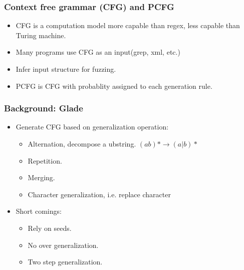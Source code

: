 \begin{frame}
	\frametitle{Context free grammar (CFG) and PCFG}
	\begin{itemize}
		\item CFG is a computation model more capable than regex, less capable than Turing machine.
		\item Many programs use CFG as an input(grep, xml, etc.)
		\item Infer input structure for fuzzing.
		\item PCFG is CFG with probablity assigned to each generation rule.
	\end{itemize}
\end{frame}
\begin{frame}
	\frametitle{Background: Glade}
	\begin{itemize}
		\item Generate CFG based on generalization operation:
		      \begin{itemize}
			      \item Alternation, decompose a ubstring. $(ab)* \rightarrow (a|b)*$
			      \item Repetition.
			      \item Merging.
			      \item Character generalization, i.e. replace character
		      \end{itemize}
		\item Short comings:
		      \begin{itemize}
			      \item Rely on seeds.
			      \item No over generalization.
			      \item Two step generalization.
		      \end{itemize}
	\end{itemize}
\end{frame}

